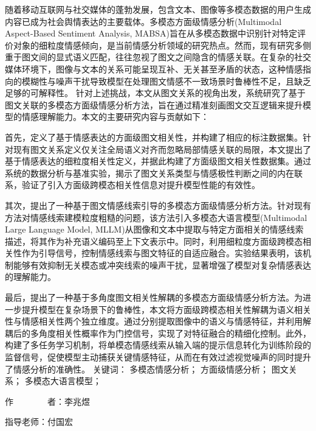 
\begin{cabstract}
随着移动互联网与社交媒体的蓬勃发展，包含文本、图像等多模态数据的用户生成内容已成为社会舆情表达的主要载体。多模态方面级情感分析(Multimodal Aspect-Based Sentiment Analysis, MABSA)旨在从多模态数据中识别针对特定评价对象的细粒度情感倾向，是当前情感分析领域的研究热点。然而，现有研究多侧重于图文间的显式语义匹配，往往忽视了图文之间隐含的情感关联。在复杂的社交媒体环境下，图像与文本的关系可能呈现互补、无关甚至矛盾的状态，这种情感指向的模糊性与噪声干扰导致模型在处理图文情感不一致场景时鲁棒性不足，且缺乏足够的可解释性。
针对上述挑战，本文从图文关系的视角出发，系统研究了基于图文关联的多模态方面级情感分析方法，旨在通过精准刻画图文交互逻辑来提升模型的情感理解能力。本文的主要研究内容与贡献如下：

首先，定义了基于情感表达的方面级图文相关性，并构建了相应的标注数据集。针对现有图文关系定义仅关注全局语义对齐而忽略局部情感关联的局限，本文提出了基于情感表达的细粒度相关性定义，并据此构建了方面级图文相关性数据集。通过系统的数据分析与基准实验，揭示了图文关系类型与情感极性判断之间的内在联系，验证了引入方面级跨模态相关性信息对提升模型性能的有效性。

其次，提出了一种基于图文情感线索引导的多模态方面级情感分析方法。针对现有方法对情感线索建模粒度粗糙的问题，该方法引入多模态大语言模型(Multimodal Large Language Model, MLLM)从图像和文本中提取与特定方面相关的情感线索描述，将其作为补充语义编码至上下文表示中。同时，利用细粒度方面级跨模态相关性作为引导信号，控制情感线索与图文特征的自适应融合。实验结果表明，该机制能够有效抑制无关模态或冲突线索的噪声干扰，显著增强了模型对复杂情感表达的理解能力。

最后，提出了一种基于多角度图文相关性解耦的多模态方面级情感分析方法。为进一步提升模型在复杂场景下的鲁棒性，本文将方面级跨模态相关性解耦为语义相关性与情感相关性两个独立维度。通过分别提取图像中的语义与情感特征，并利用解耦后的多角度相关性概率作为门控信号，实现了对特征融合的精细化控制。此外，构建了多任务学习机制，将单模态情感线索从输入端的提示信息转化为训练阶段的监督信号，促使模型主动捕获关键情感特征，从而在有效过滤视觉噪声的同时提升了情感分析的准确性。
	\vskip 21bp
	{\heiti{} 关键词：}
	多模态情感分析；
	方面级情感分析；
	图文关系；
	多模态大语言模型；
	
	\begin{flushright}
		作~~~~~~~~者：李兆煜
		
		指导老师：付国宏
		
	\end{flushright}
\end{cabstract}


